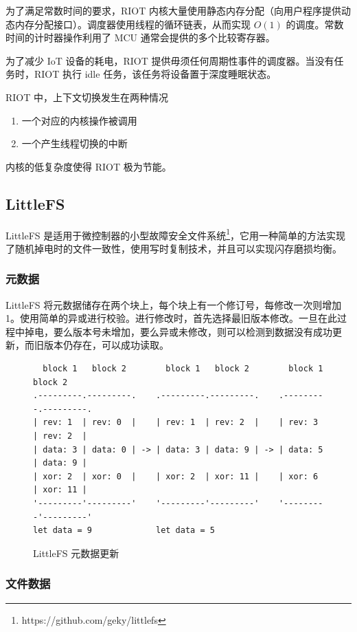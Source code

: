 \documentclass{ctexart}
\begin{document}
为了满足常数时间的要求，RIOT 内核大量使用静态内存分配（向用户程序提供动态内存分配接口）。调度器使用线程的循环链表，从而实现 $O(1)$ 的调度。常数时间的计时器操作利用了 MCU 通常会提供的多个比较寄存器。

为了减少 IoT 设备的耗电，RIOT 提供毋须任何周期性事件的调度器。当没有任务时，RIOT 执行 idle 任务，该任务将设备置于深度睡眠状态。

RIOT 中，上下文切换发生在两种情况
\begin{enumerate}
	\item 一个对应的内核操作被调用
	\item 一个产生线程切换的中断
\end{enumerate}
内核的低复杂度使得 RIOT 极为节能。

\subsection{LittleFS}

LittleFS 是适用于微控制器的小型故障安全文件系统\footnote{https://github.com/geky/littlefs}，它用一种简单的方法实现了随机掉电时的文件一致性，使用写时复制技术，并且可以实现闪存磨损均衡。

\subsubsection{元数据}

LittleFS 将元数据储存在两个块上，每个块上有一个修订号，每修改一次则增加 1。使用简单的异或进行校验。进行修改时，首先选择最旧版本修改。一旦在此过程中掉电，要么版本号未增加，要么异或未修改，则可以检测到数据没有成功更新，而旧版本仍存在，可以成功读取。

\begin{figure}
\begin{verbatim}
  block 1   block 2        block 1   block 2        block 1   block 2
.---------.---------.    .---------.---------.    .---------.---------.
| rev: 1  | rev: 0  |    | rev: 1  | rev: 2  |    | rev: 3  | rev: 2  |
| data: 3 | data: 0 | -> | data: 3 | data: 9 | -> | data: 5 | data: 9 |
| xor: 2  | xor: 0  |    | xor: 2  | xor: 11 |    | xor: 6  | xor: 11 |
'---------'---------'    '---------'---------'    '---------'---------'
let data = 9             let data = 5
\end{verbatim}
\caption{LittleFS 元数据更新}
\end{figure}

\subsubsection{文件数据}
\end{document}
